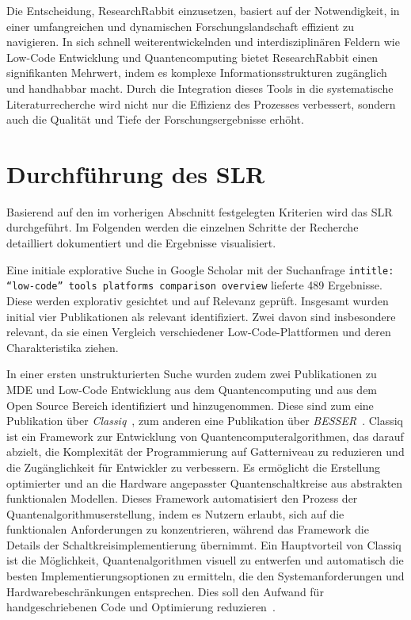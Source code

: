Die Entscheidung, ResearchRabbit einzusetzen, basiert auf der Notwendigkeit, in einer umfangreichen und 
dynamischen Forschungslandschaft effizient zu navigieren. In sich schnell weiterentwickelnden und interdisziplinären 
Feldern wie Low-Code Entwicklung und Quantencomputing bietet ResearchRabbit einen signifikanten Mehrwert, 
indem es komplexe Informationsstrukturen zugänglich und handhabbar macht. Durch die Integration dieses Tools 
in die systematische Literaturrecherche wird nicht nur die Effizienz des Prozesses verbessert, sondern auch 
die Qualität und Tiefe der Forschungsergebnisse erhöht.

\section{Durchführung des SLR}
Basierend auf den im vorherigen Abschnitt festgelegten Kriterien wird das SLR
durchgeführt. Im Folgenden werden die einzelnen Schritte der Recherche detailliert dokumentiert und die Ergebnisse 
visualisiert. 


Eine initiale explorative Suche in Google Scholar mit der Suchanfrage \texttt{intitle: ``low-code'' tools platforms comparison overview} lieferte 489 
Ergebnisse. Diese werden explorativ gesichtet und auf Relevanz geprüft. Insgesamt wurden initial vier Publikationen 
als relevant identifiziert. Zwei davon sind insbesondere relevant, da sie einen Vergleich verschiedener 
Low-Code-Plattformen und deren Charakteristika ziehen. 

In einer ersten unstrukturierten Suche wurden zudem zwei Publikationen zu MDE und Low-Code Entwicklung aus dem Quantencomputing und 
aus dem Open Source Bereich identifiziert und hinzugenommen. Diese sind zum eine Publikation über \textit{Classiq}~\cite{minerbi2022quantum}, zum anderen 
eine Publikation über \textit{BESSER}~\cite{alfonso2024building}. 
Classiq ist ein Framework zur Entwicklung von Quantencomputeralgorithmen, das darauf abzielt, die Komplexität der Programmierung 
auf Gatterniveau zu reduzieren und die Zugänglichkeit für Entwickler zu verbessern. Es ermöglicht die Erstellung optimierter und 
an die Hardware angepasster Quantenschaltkreise aus abstrakten funktionalen Modellen. Dieses Framework automatisiert den Prozess der 
Quantenalgorithmuserstellung, indem es Nutzern erlaubt, sich auf die funktionalen Anforderungen zu konzentrieren, während das Framework 
die Details der Schaltkreisimplementierung übernimmt. Ein Hauptvorteil von Classiq ist die Möglichkeit, Quantenalgorithmen visuell zu 
entwerfen und automatisch die besten Implementierungsoptionen 
zu ermitteln, die den Systemanforderungen und Hardwarebeschränkungen entsprechen. Dies soll den Aufwand für handgeschriebenen Code und 
Optimierung reduzieren~\cite{minerbi2022quantum}. 

